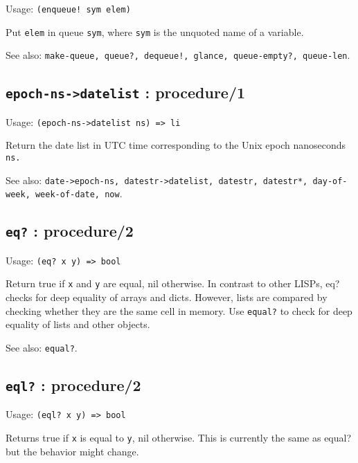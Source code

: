 \documentclass[
]{article}
\newcommand{\passthrough}[1]{#1}
\begin{document}
Usage: \passthrough{\lstinline"(enqueue! sym elem)"}

Put \passthrough{\lstinline!elem!} in queue
\passthrough{\lstinline!sym!}, where \passthrough{\lstinline!sym!} is
the unquoted name of a variable.

See also:
\passthrough{\lstinline"make-queue, queue?, dequeue!, glance, queue-empty?, queue-len"}.

\hypertarget{epoch-ns-datelist-procedure1-1}{%
\subsection{\texorpdfstring{\texttt{epoch-ns-\textgreater{}datelist} :
procedure/1}{epoch-ns-\textgreater datelist : procedure/1}}\label{epoch-ns-datelist-procedure1-1}}

Usage: \passthrough{\lstinline!(epoch-ns->datelist ns) => li!}

Return the date list in UTC time corresponding to the Unix epoch
nanoseconds \passthrough{\lstinline!ns.!}

See also:
\passthrough{\lstinline!date->epoch-ns, datestr->datelist, datestr, datestr*, day-of-week, week-of-date, now!}.

\hypertarget{eq-procedure2-1}{%
\subsection{\texorpdfstring{\texttt{eq?} :
procedure/2}{eq? : procedure/2}}\label{eq-procedure2-1}}

Usage: \passthrough{\lstinline!(eq? x y) => bool!}

Return true if \passthrough{\lstinline!x!} and
\passthrough{\lstinline!y!} are equal, nil otherwise. In contrast to
other LISPs, eq? checks for deep equality of arrays and dicts. However,
lists are compared by checking whether they are the same cell in memory.
Use \passthrough{\lstinline!equal?!} to check for deep equality of lists
and other objects.

See also: \passthrough{\lstinline!equal?!}.

\hypertarget{eql-procedure2-1}{%
\subsection{\texorpdfstring{\texttt{eql?} :
procedure/2}{eql? : procedure/2}}\label{eql-procedure2-1}}

Usage: \passthrough{\lstinline!(eql? x y) => bool!}

Returns true if \passthrough{\lstinline!x!} is equal to
\passthrough{\lstinline!y!}, nil otherwise. This is currently the same
as equal? but the behavior might change.
\end{document}
